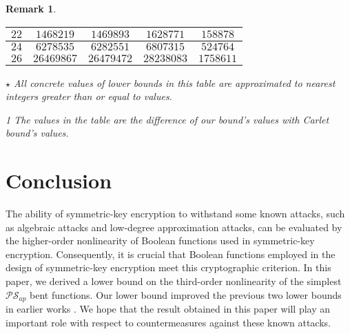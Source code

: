 \documentclass{article}
\newcommand{\0}{\textbf{0}}
\newcommand{\1}{\textbf{1}}
\theoremstyle{plain}
\newtheorem{remark}{Remark}
\begin{document}
\begin{remark}
\begin{table}
\begin{threeparttable}
\begin{tabular}{|c|c|c|c|c|}
                    $22 $ &  $ 1468219     $       & $ 1469893  $     & $ 1628771  $     & $  158878  $ \\  \hline
                    $24 $ &  $ 6278535     $       & $ 6282551  $     & $ 6807315  $     & $  524764  $ \\  \hline
                    $26 $ &  $ 26469867    $       & $ 26479472 $     & $ 28238083 $     & $  1758611 $ \\  \hline
                \end{tabular}
                \begin{tablenotes}
                    \footnotesize
                    \item[$\star$] All concrete values of lower bounds in this table are approximated to nearest  integers greater than or equal to values.
                    \item[1] The values in the table are the difference of our bound's values with  Carlet bound's values.
                \end{tablenotes}
            \end{threeparttable}
            \label{table:MyTableLabel}
        \end{table}
    \end{remark}


\section{Conclusion}
    The ability of symmetric-key encryption to withstand some known attacks, such as algebraic attacks and low-degree approximation attacks, can be evaluated by the higher-order nonlinearity of Boolean functions used in symmetric-key encryption.
    Consequently, it is crucial that Boolean functions employed in the design of symmetric-key encryption meet this cryptographic criterion.
    In this paper, we derived a lower bound on the third-order nonlinearity of the simplest $\mathcal{PS}_{ap}$ bent functions.
    Our lower bound improved the previous two lower bounds in earlier works \cite{TangCT2013NL_2bent,Carlet2011NL_Profile_Dillon}.
    We hope that the result obtained in this paper will play an important role with respect to countermeasures against these known attacks.



\end{document}
